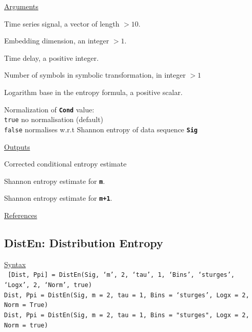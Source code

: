 \documentclass[12pt, a4paper, titlepage, openany]{book}
\begin{document}
\noindent \ul{Arguments}
\begin{description}[labelsep=1cm, labelwidth=2cm, nosep, style=multiline,leftmargin=3cm]\footnotesize
\item[\texttt{Sig}]		Time series signal, a vector of length $> 10$.
\item[\texttt{m}]		Embedding dimension, an integer $> 1$.
\item[\texttt{tau}]		Time delay, a positive integer.
\item[\texttt{c}]		Number of symbols in symbolic transformation, in integer $> 1$
\item[\texttt{Logx}]	Logarithm base in the entropy formula, a positive scalar.
\item[\texttt{Norm}]	Normalization of \texttt{\textbf{Cond}} value:\\
		  \texttt{true} \hspace{15pt}  no normalisation (default)\\
		  \texttt{false} \hspace{10pt}  normalises w.r.t Shannon entropy of data sequence \texttt{\textbf{Sig}}
\end{description}

\noindent \ul{Outputs}
\begin{description}[labelsep=1cm, labelwidth=2cm, nosep, style=multiline,leftmargin=3cm]\footnotesize
\item[\texttt{Cond}]		Corrected conditional entropy estimate
\item[\texttt{SEw}]		Shannon entropy estimate for \texttt{\textbf{m}}.
\item[\texttt{SEz}]		Shannon entropy estimate for \texttt{\textbf{m+1}}.
\end{description}

\noindent \ul{References}\hspace{1cm}
\cite{Cond1}



\newpage
\subsection{\normalsize DistEn: \hspace{15mm} Distribution Entropy} \label{DistEn}
\noindent\ul{Syntax} \vspace{6mm} \\ \noindent \texttt{\footnotesize
[Dist, Ppi] = DistEn(Sig, ‘m’, 2, ‘tau’, 1, ‘Bins’, ‘sturges’, ‘Logx’, 2, ‘Norm’, true)\\
 Dist, Ppi  = DistEn(Sig, m = 2, tau = 1, Bins = ‘sturges’, Logx = 2, Norm = True)\\ 
 Dist, Ppi  = DistEn(Sig, m = 2, tau = 1, Bins = "sturges", Logx = 2, Norm = true)}
\end{document}
